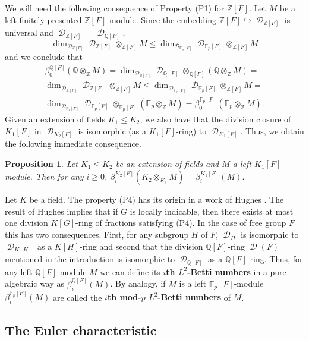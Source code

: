 \documentclass{amsart}
\newtheorem{pro}[lem]{Proposition}
\theoremstyle{definition}
\theoremstyle{remark}
\DeclareMathOperator{\D}{\mathcal D}
\newcommand{\Z}{\mathbb{Z}}
\newcommand{\F}{\mathbb{F}}
\newcommand{\Q}{\mathbb{Q}}
\begin{document}
We will need the following consequence of Property (P1) for $\Z[F]$. Let  $M$ be  a left  finitely presented   $\Z[F]$-module. Since the embedding $\Z[F]\hookrightarrow \D_{\Z[F]}$ is universal and $\D_{\Z[F]}=\D_{\Q[F]}$,
$$\dim_{\D_{\Z[F]}}\D_{\Z[F]}\otimes_{\Z[F]} M\le 
\dim_{\D_{\F_p[F]}}\D_{\F_p[F]}\otimes_{\Z[F]} M$$
and  we conclude that %
\begin{multline}\label{Qp}
\beta_0^{\Q[F]}(\Q\otimes_{\Z} M)=\dim_{\D_{\Q[F]}}\D_{\Q[F]}\otimes_{\Q[F]} (\Q\otimes_{\Z} M)=\\ \dim_{\D_{\Z[F]}}\D_{\Z[F]}\otimes_{\Z[F]} M\le 
\dim_{\D_{\F_p[F]}}\D_{\F_p[F]}\otimes_{\Z[F]} M=\\ \dim_{\D_{\F_p[F]}}\D_{\F_p[F]}\otimes_{\F_p[F]} (\F_p\otimes_{\Z} M)= \beta_0^{\F_p[F]}(\F_p\otimes_{\Z} M).
\end{multline}
Given an extension of fields $K_1\le K_2$, we also have that the division closure of $K_1[F]$ in $\D_{K_2[F]}$ is isomorphic (as a $K_1[F]$-ring) to  $\D_{K_1[F]}$. 
Thus, we obtain the following immediate consequence.
\begin{pro}\label{extfields} Let  $K_1\le K_2$ be an extension of fields and $M$ a
left  $K_1[F]$-module.  Then %
for any $i\geqslant  0$,
$
\beta_i^{K_2[F]}(K_2\otimes_{K_1} M)=\beta_i^{K_1[F]}(M).
$
\end{pro}
  
  
  Let $K$ be a field. The property (P4) has its origin in a work of Hughes  \cite{Hu70}. The result of Hughes implies that   if $G$ is locally indicable,  then there exists at most one division $K[G]$-ring of fractions satisfying (P4). In the case of free  group $F$ this has two consequences. First,  
  for any subgroup $H$ of $F$, $\D_H$ is isomorphic to $\D_{K[H]}$ as a $K[H]$-ring  and second that 
  the division $\Q[F]$-ring $\D(F)$ mentioned in the introduction is isomorphic to $\D_{\Q[F]}$ as a $\Q[F]$-ring. Thus, for any left $\Q[F]$-module $M$ we can define its {\bf $i$th $L^2$-Betti numbers} in a pure algebraic way as
$\beta_i^{\Q[F]}(M)$. By analogy, if $M$ is a left $\F_p[F]$-module $\beta_i^{\F_p[F]}(M)$ are called
the {\bf $i$th mod-$p$ $L^2$-Betti numbers} of $M$. 




\subsection{The Euler characteristic}\label{sectFL}
\end{document}
